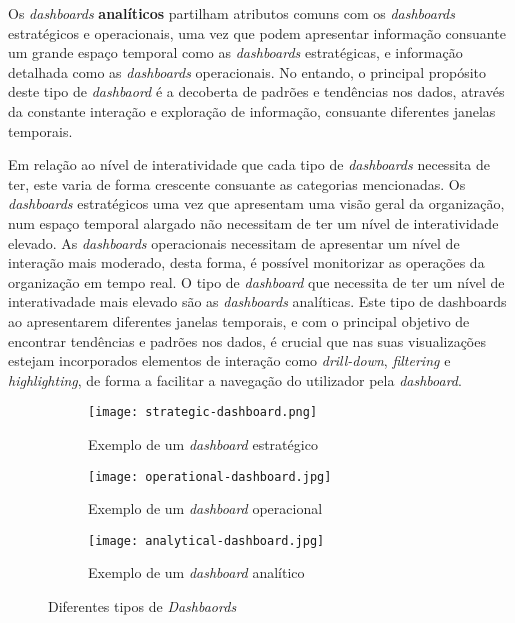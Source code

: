 Os \textit{dashboards} \textbf{analíticos} partilham atributos comuns com os \textit{dashboards} estratégicos e operacionais, uma vez que podem apresentar informação consuante um grande espaço temporal como as \textit{dashboards} estratégicas, e informação detalhada como as \textit{dashboards} operacionais. No entando, o principal propósito deste tipo de \textit{dashbaord} é a decoberta de padrões e tendências nos dados, através da constante interação e exploração de informação, consuante diferentes janelas temporais.

Em relação ao nível de interatividade que cada tipo de \textit{dashboards} necessita de ter, este varia de forma crescente consuante as categorias mencionadas. Os \textit{dashboards} estratégicos uma vez que apresentam uma visão geral da organização, num espaço temporal alargado não necessitam de ter um nível de interatividade elevado. As \textit{dashboards} operacionais necessitam de apresentar um nível de interação mais moderado, desta forma, é possível monitorizar as operações da organização em tempo real. O tipo de \textit{dashboard} que necessita de ter um nível de interativadade mais elevado são as \textit{dashboards} analíticas. Este tipo de dashboards ao apresentarem diferentes janelas temporais, e com o principal objetivo de encontrar tendências e padrões nos dados, é crucial que nas suas visualizações estejam incorporados elementos de interação como \textit{drill-down}, \textit{filtering} e \textit{highlighting}, de forma a facilitar a navegação do utilizador pela \textit{dashboard}.

\begin{figure}[htbp]
  \begin{subfigure}{0.5\textwidth}
    \texttt{[image: strategic-dashboard.png]} 
    \caption{Exemplo de um \textit{dashboard} estratégico}
    \label{fig:strat-dash}
  \end{subfigure}
  \begin{subfigure}{0.5\textwidth}
    \texttt{[image: operational-dashboard.jpg]}
    \caption{Exemplo de um \textit{dashboard} operacional}
    \label{fig:op-dash}
  \end{subfigure}
  \begin{subfigure}{0.5\textwidth}
    \texttt{[image: analytical-dashboard.jpg]}
    \caption{Exemplo de um \textit{dashboard} analítico}
    \label{fig:anal-dash}
  \end{subfigure}
  
  \caption{Diferentes tipos de \textit{Dashbaords}}
  \label{fig:image2}
\end{figure}


